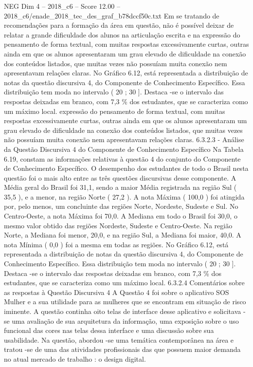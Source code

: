 \begin{textsample}{NEG Dim 4 – 2018\_c6 – Score 12.00 – 2018\_c6/enade\_2018\_tec\_des\_graf\_b78dccf50c.txt}
Em se tratando de recomendações para a formação da área em questão, não é possível deixar de relatar a grande dificuldade dos alunos na articulação escrita e na expressão do pensamento de forma textual, com muitas respostas excessivamente curtas, outras ainda em que os alunos apresentaram um grau elevado de dificuldade na conexão dos conteúdos listados, que muitas vezes não possuíam muita conexão nem apresentavam relações claras.
No Gráfico 6.12, está representada a distribuição de notas da questão discursiva 4, do Componente de Conhecimento Específico.
Essa distribuição tem moda no intervalo ( 20 ; 30 ].
Destaca -se o intervalo das respostas deixadas em branco, com 7,3 \% dos estudantes, que se caracteriza como um máximo local. expressão do pensamento de forma textual, com muitas respostas excessivamente curtas, outras ainda em que os alunos apresentaram um grau elevado de dificuldade na conexão dos conteúdos listados, que muitas vezes não possuíam muita conexão nem apresentavam relações claras. 6.3.2.3 - Análise da Questão Discursiva 4 do Componente de Conhecimento Específico Na Tabela 6.19, constam as informações relativas à questão 4 do conjunto do Componente de Conhecimento Específico.
O desempenho dos estudantes de todo o Brasil nesta questão foi o mais alto entre as três questões discursivas desse componente.
A Média geral do Brasil foi 31,1, sendo a maior Média registrada na região Sul ( 35,5 ), e a menor, na região Norte ( 27,2 ).
A nota Máxima ( 100,0 ) foi atingida por, pelo menos, um concluinte das regiões Norte, Nordeste, Sudeste e Sul.
No Centro-Oeste, a nota Máxima foi 70,0.
A Mediana em todo o Brasil foi 30,0, o mesmo valor obtido das regiões Nordeste, Sudeste e Centro-Oeste.
Na região Norte, a Mediana foi menor, 20,0, e na região Sul, a Mediana foi maior, 40,0.
A nota Mínima ( 0,0 ) foi a mesma em todas as regiões.
No Gráfico 6.12, está representada a distribuição de notas da questão discursiva 4, do Componente de Conhecimento Específico.
Essa distribuição tem moda no intervalo ( 20 ; 30 ].
Destaca -se o intervalo das respostas deixadas em branco, com 7,3 \% dos estudantes, que se caracteriza como um máximo local. 6.3.2.4 Comentários sobre as respostas à Questão Discursiva 4 A Questão 4 foi sobre o aplicativo SOS Mulher e a sua utilidade para as mulheres que se encontram em situação de risco iminente.
A questão continha oito telas de interface desse aplicativo e solicitava -se uma avaliação de sua arquitetura da informação, uma exposição sobre o uso funcional das cores nas telas dessa interface e uma discussão sobre sua usabilidade.
Na questão, abordou -se uma temática contemporânea na área e tratou -se de uma das atividades profissionais das que possuem maior demanda no atual mercado de trabalho : o design digital.

\end{textsample}
